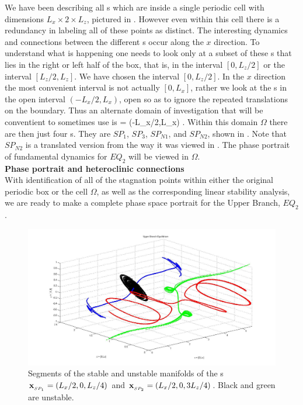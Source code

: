 \documentclass[letter,12pt,openany]{article}
\begin{document}
   We have been describing all \stagp s which are
   inside a single periodic cell with dimensions $L_x \times 2 \times L_z$, pictured in . However even within this cell
   there is a redundancy in labeling all of these points as
   distinct. 
   The interesting dynamics and connections between the different \stagp s occur
 along the $x$ direction. To understand what is happening one needs
 to look only at a subset of these \stagp s that lies in the right or left half of the box, that
 is, in the interval $[0,L_{z}/2]$ or the interval $[L_{z}/2,L_{z}]$. We have chosen
 the interval $[0,L_{z}/2]$. In
 the $x$ direction the most convenient interval is not actually
 $[0,L_{x}]$, rather we look at the \stagp s in the open interval
 $(-L_{x}/2,L_{x})$, open so as to ignore the repeated translations on the boundary. Thus an alternate domain of investigation that will be conventient to sometimes use is
 \beq \Omega = (-L_{x}/2,L_{x}) \times [-1,1] \times [0,L_{z}/2].
 \eeq
 Within this domain $\Omega$ there are then just four \stagp s. They are $SP_1$, $SP_3$, $SP_{N1}$, and
 $SP_{N2}$, shown in
  . Note that $SP_{N2}$ is a
 translated version from the way it was viewed in
 . The phase portrait of fundamental dynamics for $EQ_2$ will be viewed in $\Omega$.  \\ 
   
   


\noindent \textbf{Phase portrait and heteroclinic connections} \\


With identification of all of the stagnation points within either the original periodic box or the cell $\Omega$, as well as the corresponding linear stability analysis, we are ready to make a complete phase space portrait for the Upper Branch, $EQ_2$. \\

\begin{figure}[!h]
\includegraphics[width=1.0\textwidth]{manifolds_both.jpg}
  \caption{
   Segments of the stable and unstable manifolds of the \stagp s
   $\bold{x}_{_{SP_{1}}} = (L_x/2,0,L_z/4)$ and
   $\bold{x}_{_{SP_{2}}} = (L_x/2,0,3L_z/4)$. Black and green are unstable.
   }
  \label{eltonFig:manifolds_both}
 \end{figure}
\end{document}
